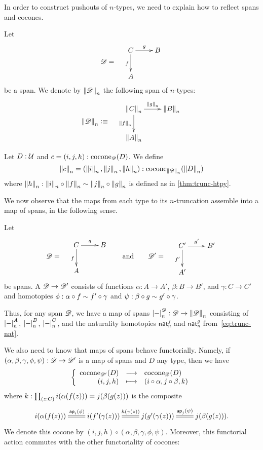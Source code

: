 In order to construct pushouts of $n$-types, we need to explain how to reflect spans and cocones.

\bgroup
\def\reflect(#1){\trunc n{#1}}

\begin{defn}
  Let
  \[\Ddiag=\quad\vcenter{\xymatrix{C \ar^g[r] \ar_f[d] & B \\ A & }}\]
  be a span. We denote by $\reflect(\Ddiag)$ the following
  span of $n$-types:
  \[\reflect(\Ddiag)\defeq\quad \vcenter{\xymatrix{\reflect(C) \ar^{\reflect(g)}[r]
      \ar_{\reflect(f)}[d] & \reflect(B) \\ \reflect(A) & }}\]
\end{defn}

\begin{defn}
  Let $D:\type$ and $c=(i,j,h):\cocone{\Ddiag}{D}$.
  We define
  \[\reflect(c)=(\reflect(i),\reflect(j),\reflect(h)):
  \cocone{\reflect(\Ddiag)}{\reflect(D)}\]
  where $\reflect(h): \reflect(i) \circ \reflect(f) \htpy \reflect(j) \circ \reflect(g)$ is defined as in \autoref{thm:trunc-htpy}.
\end{defn}

\egroup

We now observe that the maps from each type to its $n$-truncation assemble into a map of spans, in the following sense.

\begin{defn}
  Let 
  \[\Ddiag=\quad\vcenter{\xymatrix{C \ar^g[r] \ar_f[d] & B \\ A & }}
  \qquad\text{and}\qquad
  \Ddiag'=\quad\vcenter{\xymatrix{C' \ar^{g'}[r] \ar_{f'}[d] & B' \\ A' & }}
  \]
  be spans.
  A  $\Ddiag \to \Ddiag'$ consists of functions $\alpha:A\to A'$, $\beta:B\to B'$, and $\gamma:C\to C'$ and homotopies $\phi: \alpha\circ f \htpy f'\circ \gamma$ and $\psi:\beta\circ g \htpy g' \circ \gamma$.
\end{defn}

Thus, for any span $\Ddiag$, we have a map of spans $\tproj[\Ddiag] n- : \Ddiag \to \trunc n\Ddiag$ consisting of $\tproj[A]n-$, $\tproj[B]n-$, $\tproj[C]n-$, and the naturality homotopies $\mathsf{nat}^f_n$ and $\mathsf{nat}^g_n$ from~\eqref{eq:trunc-nat}.

We also need to know that maps of spans behave functorially.
Namely, if $(\alpha,\beta,\gamma,\phi,\psi):\Ddiag \to \Ddiag'$ is a map of spans and $D$ any type, then we have
\[ \function{\cocone{\Ddiag'}{D}}{\cocone{\Ddiag}{D}}{(i,j,h)}{(i\circ \alpha,j\circ\beta, k)} \]
where $k: \prd{z:C} i(\alpha(f(z))) = j(\beta(g(z)))$ is the composite
\begin{equation}\label{eq:mapofspans-htpy}
\xymatrix{
  i(\alpha(f(z))) \ar@{=}[r]^{\apfunc{i}(\phi)} &
  i(f'(\gamma(z))) \ar@{=}[r]^{h(\gamma(z))} &
  j(g'(\gamma(z))) \ar@{=}[r]^{\apfunc{j}(\psi)} &
  j(\beta(g(z))). }
\end{equation}
We denote this cocone by $(i,j,h) \circ (\alpha,\beta,\gamma,\phi,\psi)$.
Moreover, this functorial action commutes with the other functoriality of cocones:

